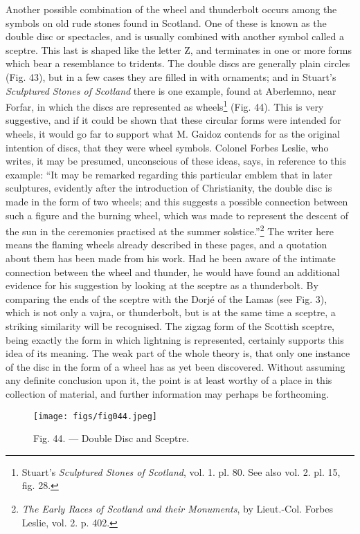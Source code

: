 \documentclass[a4paper, 11pt, oneside, polutonikogreek, english]{article}
\begin{document}
Another possible combination of the wheel and thunderbolt occurs among the symbols on old rude stones found in Scotland. One of these is known as the double disc or spectacles, and is usually combined with another symbol called a sceptre. This last is shaped like the letter Z, and terminates in one or more forms which bear a resemblance to tridents. The double discs are generally plain circles (Fig. 43), but in a few cases they are filled in with ornaments; and in Stuart's \emph{Sculptured Stones of Scotland} there is one example, found at Aberlemno, near Forfar, in which the discs are represented as wheels\footnote{Stuart's \emph{Sculptured Stones of Scotland}, vol. 1. pl. 80. See also vol. 2. pl. 15, fig. 28.} (Fig. 44). This is very suggestive, and if it could be shown that these circular forms were intended for wheels, it would go far to support what M. Gaidoz contends for as the original intention of discs, that they were wheel symbols. Colonel Forbes Leslie, who writes, it may be presumed, unconscious of these ideas, says, in reference to this example: ``It may be remarked regarding this particular emblem that in later sculptures, evidently after the introduction of Christianity, the double disc is made in the form of two wheels; and this suggests a possible connection between such a figure and the burning wheel, which was made to represent the descent of the sun in the ceremonies practised at the summer solstice.''\footnote{\emph{The Early Races of Scotland and their Monuments}, by Lieut.-Col. Forbes Leslie, vol. 2. p. 402.} The writer here means the flaming wheels already described in these pages, and a quotation about them has been made from his work. Had he been aware of the intimate connection between the wheel and thunder, he would have found an additional evidence for his suggestion by looking at the sceptre as a thunderbolt. By comparing the ends of the sceptre with the Dorjé of the Lamas (see Fig. 3), which is not only a vajra, or thunderbolt, but is at the same time a sceptre, a striking similarity will be recognised. The zigzag form of the Scottish sceptre, being exactly the form in which lightning is represented, certainly supports this idea of its meaning. The weak part of the whole theory is, that only one instance of the disc in the form of a wheel has as yet been discovered. Without assuming any definite conclusion upon it, the point is at least worthy of a place in this collection of material, and further information may perhaps be forthcoming.
 
\begin{figure}[H]
\centering
\texttt{[image: figs/fig044.jpeg]}
\caption{Fig. 44. --- Double Disc and Sceptre.}
\end{figure}
\end{document}
